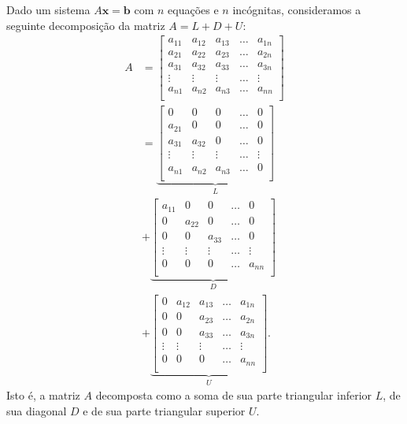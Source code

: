 Dado um sistema $A\pmb{x} = \pmb{b}$ com $n$ equações e $n$ incógnitas, consideramos a seguinte decomposição da matriz $A = L + D + U$:
\begin{align}
  A &=
  \begin{bmatrix}
    a_{11} & a_{12} & a_{13} & \ldots & a_{1n}\\
    a_{21} & a_{22} & a_{23} & \ldots & a_{2n}\\
    a_{31} & a_{32} & a_{33} & \ldots & a_{3n}\\
    \vdots & \vdots & \vdots & \ldots & \vdots\\
    a_{n1} & a_{n2} & a_{n3} & \ldots & a_{nn}\\
  \end{bmatrix}\\
    &= \underbrace{\begin{bmatrix}
    0 & 0 & 0 & \ldots & 0\\
    a_{21} & 0 & 0 & \ldots & 0\\
    a_{31} & a_{32} & 0 & \ldots & 0\\
    \vdots & \vdots & \vdots & \ldots & \vdots\\
    a_{n1} & a_{n2} & a_{n3} & \ldots & 0\\
  \end{bmatrix}}_{L}\\
    &+ \underbrace{\begin{bmatrix}
    a_{11} & 0 & 0 & \ldots & 0\\
    0 & a_{22} & 0 & \ldots & 0\\
    0 & 0 & a_{33} & \ldots & 0\\
    \vdots & \vdots & \vdots & \ldots & \vdots\\
    0 & 0 & 0 & \ldots & a_{nn}\\
  \end{bmatrix}}_{D}\\
  &+ \underbrace{\begin{bmatrix}
    0 & a_{12} & a_{13} & \ldots & a_{1n}\\
    0 & 0 & a_{23} & \ldots & a_{2n}\\
    0 & 0 & a_{33} & \ldots & a_{3n}\\
    \vdots & \vdots & \vdots & \ldots & \vdots\\
    0 & 0 & 0 & \ldots & a_{nn}\\
  \end{bmatrix}}_{U}.
\end{align}
Isto é, a matriz $A$ decomposta como a soma de sua parte triangular inferior $L$, de sua diagonal $D$ e de sua parte triangular superior $U$.

